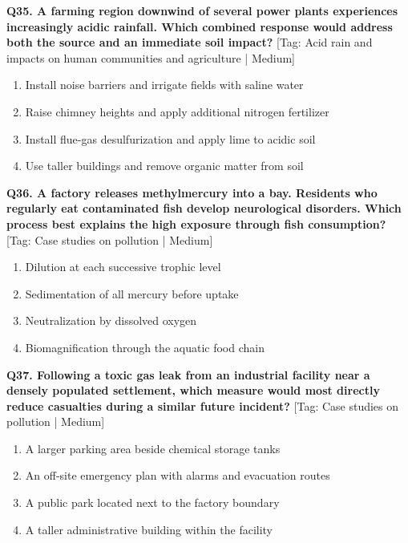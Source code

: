 \noindent\textbf{Q35. A farming region downwind of several power plants experiences increasingly acidic rainfall. Which combined response would address both the source and an immediate soil impact?} \hfill [Tag: Acid rain and impacts on human communities and agriculture | Medium]
\begin{enumerate}[label=(\alph*),topsep=2pt,itemsep=1pt,partopsep=0pt,parsep=0pt]
    \item {Install noise barriers and irrigate fields with saline water}
    \item {Raise chimney heights and apply additional nitrogen fertilizer}
    \item {Install flue-gas desulfurization and apply lime to acidic soil}
    \item {Use taller buildings and remove organic matter from soil}
\end{enumerate}
\vspace{2mm}

\noindent\textbf{Q36. A factory releases methylmercury into a bay. Residents who regularly eat contaminated fish develop neurological disorders. Which process best explains the high exposure through fish consumption?} \hfill [Tag: Case studies on pollution | Medium]
\begin{enumerate}[label=(\alph*),topsep=2pt,itemsep=1pt,partopsep=0pt,parsep=0pt]
    \item {Dilution at each successive trophic level}
    \item {Sedimentation of all mercury before uptake}
    \item {Neutralization by dissolved oxygen}
    \item {Biomagnification through the aquatic food chain}
\end{enumerate}
\vspace{2mm}

\noindent\textbf{Q37. Following a toxic gas leak from an industrial facility near a densely populated settlement, which measure would most directly reduce casualties during a similar future incident?} \hfill [Tag: Case studies on pollution | Medium]
\begin{enumerate}[label=(\alph*),topsep=2pt,itemsep=1pt,partopsep=0pt,parsep=0pt]
    \item {A larger parking area beside chemical storage tanks}
    \item {An off-site emergency plan with alarms and evacuation routes}
    \item {A public park located next to the factory boundary}
    \item {A taller administrative building within the facility}
\end{enumerate}
\vspace{2mm}

